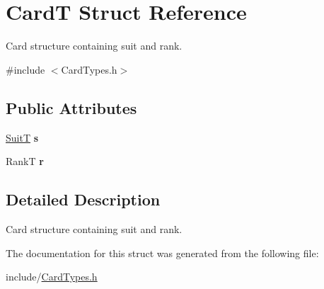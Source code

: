 \hypertarget{struct_card_t}{}\section{CardT Struct Reference}
\label{struct_card_t}


Card structure containing suit and rank.  




{\ttfamily \#include $<$Card\+Types.\+h$>$}

\subsection*{Public Attributes}
\begin{DoxyCompactItemize}
\item 
\hyperlink{_card_types_8h_a693d1a7b7ef1b91ead9c7dfc49830565}{SuitT} {\bfseries s}\hypertarget{struct_card_t_a385c4f8ec261203df28f85f69f28780d}{}\label{struct_card_t_a385c4f8ec261203df28f85f69f28780d}

\item 
RankT {\bfseries r}\hypertarget{struct_card_t_a306faf354f2fb4bb43439f84bbc49f05}{}\label{struct_card_t_a306faf354f2fb4bb43439f84bbc49f05}

\end{DoxyCompactItemize}


\subsection{Detailed Description}
Card structure containing suit and rank. 

The documentation for this struct was generated from the following file\+:\begin{DoxyCompactItemize}
\item 
include/\hyperlink{_card_types_8h}{Card\+Types.\+h}\end{DoxyCompactItemize}

